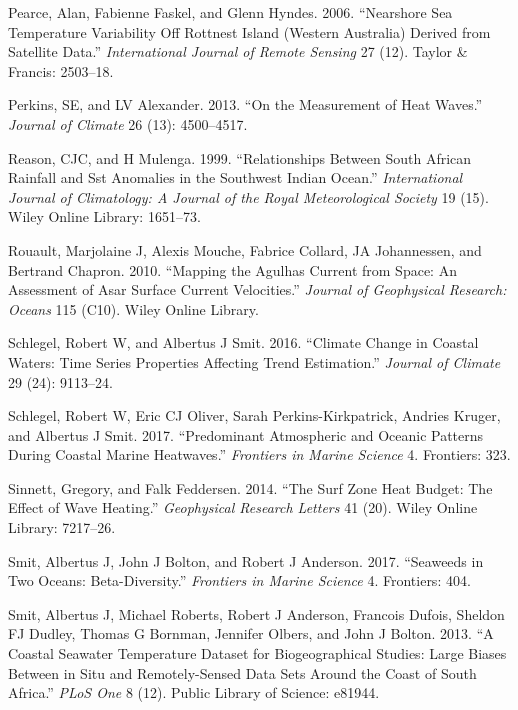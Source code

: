 \documentclass[12pt,A4paper,]{article}
\begin{document}
\hypertarget{ref-Pearce2006}{}
Pearce, Alan, Fabienne Faskel, and Glenn Hyndes. 2006. ``Nearshore Sea
Temperature Variability Off Rottnest Island (Western Australia) Derived
from Satellite Data.'' \emph{International Journal of Remote Sensing} 27
(12). Taylor \& Francis: 2503--18.

\hypertarget{ref-Perkins2013}{}
Perkins, SE, and LV Alexander. 2013. ``On the Measurement of Heat
Waves.'' \emph{Journal of Climate} 26 (13): 4500--4517.

\hypertarget{ref-Reason1999}{}
Reason, CJC, and H Mulenga. 1999. ``Relationships Between South African
Rainfall and Sst Anomalies in the Southwest Indian Ocean.''
\emph{International Journal of Climatology: A Journal of the Royal
Meteorological Society} 19 (15). Wiley Online Library: 1651--73.

\hypertarget{ref-Rouault2010}{}
Rouault, Marjolaine J, Alexis Mouche, Fabrice Collard, JA Johannessen,
and Bertrand Chapron. 2010. ``Mapping the Agulhas Current from Space: An
Assessment of Asar Surface Current Velocities.'' \emph{Journal of
Geophysical Research: Oceans} 115 (C10). Wiley Online Library.

\hypertarget{ref-Schlegel2016}{}
Schlegel, Robert W, and Albertus J Smit. 2016. ``Climate Change in
Coastal Waters: Time Series Properties Affecting Trend Estimation.''
\emph{Journal of Climate} 29 (24): 9113--24.

\hypertarget{ref-Schlegel2017}{}
Schlegel, Robert W, Eric CJ Oliver, Sarah Perkins-Kirkpatrick, Andries
Kruger, and Albertus J Smit. 2017. ``Predominant Atmospheric and Oceanic
Patterns During Coastal Marine Heatwaves.'' \emph{Frontiers in Marine
Science} 4. Frontiers: 323.

\hypertarget{ref-Sinnett2014}{}
Sinnett, Gregory, and Falk Feddersen. 2014. ``The Surf Zone Heat Budget:
The Effect of Wave Heating.'' \emph{Geophysical Research Letters} 41
(20). Wiley Online Library: 7217--26.

\hypertarget{ref-Smit2017}{}
Smit, Albertus J, John J Bolton, and Robert J Anderson. 2017. ``Seaweeds
in Two Oceans: Beta-Diversity.'' \emph{Frontiers in Marine Science} 4.
Frontiers: 404.

\hypertarget{ref-Smit2013}{}
Smit, Albertus J, Michael Roberts, Robert J Anderson, Francois Dufois,
Sheldon FJ Dudley, Thomas G Bornman, Jennifer Olbers, and John J Bolton.
2013. ``A Coastal Seawater Temperature Dataset for Biogeographical
Studies: Large Biases Between in Situ and Remotely-Sensed Data Sets
Around the Coast of South Africa.'' \emph{PLoS One} 8 (12). Public
Library of Science: e81944.
\end{document}
